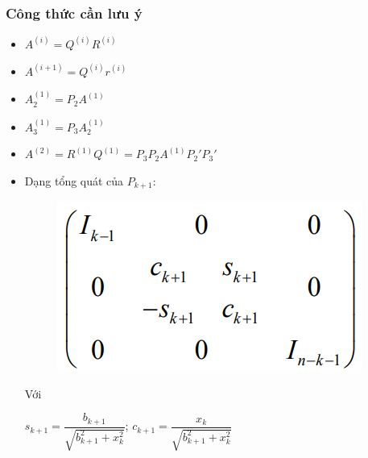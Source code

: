 \subsubsection{Công thức cần lưu ý}
\begin{itemize}
	\item $A^{(i)}=Q^{(i)}R^{(i)}$ 
	\item $A^{(i+1)}=Q^{(i)}r^{(i)}$
	\item $A_2^{(1)}=P_2A^{(1)}$
	\item $A_3^{(1)}=P_3A^{(1)}_2$
	\item $A^{(2)}=R^{(1)}Q^{(1)}=P_3P_2A^{(1)}P_2'P_3'$
	\item Dạng tổng quát của $P_{k+1}$:\\
	\begin{center}
		\begin{figure}[!ht]
			\centering
			\includegraphics[scale=0.27]{matran}
		\end{figure}
	\end{center}
	Với 
	\begin{center}
		$s_{k+1}=\dfrac{b_{k+1}}{\sqrt{b^2_{k+1}+x^2_k}}$; $c_{k+1}=\dfrac{x_k}{\sqrt{b^2_{k+1}+x^2_k}}$
	\end{center}
\end{itemize}

